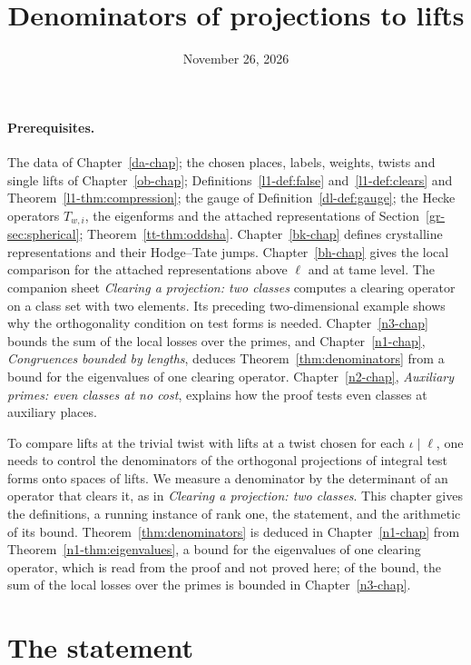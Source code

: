 \documentclass[reqno]{amsart}
\title{Denominators of projections to lifts}
\author{}
\date{November 26, 2026}
\newcounter{chap}
\theoremstyle{definition}
\theoremstyle{plain}
\begin{document}
\maketitle
{}\label{chap}

\paragraph{Prerequisites.}
The data of Chapter~\ref{da-chap}; the chosen places, labels, weights, twists and single lifts of Chapter~\ref{ob-chap}; Definitions~\ref{l1-def:false} and~\ref{l1-def:clears} and Theorem~\ref{l1-thm:compression}; the gauge of Definition~\ref{dl-def:gauge}; the Hecke operators \(T_{w,i}\), the eigenforms and the attached representations of Section~\ref{gr-sec:spherical}; Theorem~\ref{tt-thm:oddsha}.  Chapter~\ref{bk-chap} defines crystalline representations and their Hodge--Tate jumps.  Chapter~\ref{bh-chap} gives the local comparison for the attached representations above \(\ell\) and at tame level.  The companion sheet \emph{Clearing a projection: two classes} computes a clearing operator on a class set with two elements.  Its preceding two-dimensional example shows why the orthogonality condition on test forms is needed.  Chapter~\ref{n3-chap} bounds the sum of the local losses over the primes, and Chapter~\ref{n1-chap}, \emph{Congruences bounded by lengths}, deduces Theorem~\ref{thm:denominators} from a bound for the eigenvalues of one clearing operator.  Chapter~\ref{n2-chap}, \emph{Auxiliary primes: even classes at no cost}, explains how the proof tests even classes at auxiliary places.

To compare lifts at the trivial twist with lifts at a twist chosen for each \(\iota \mid \ell\), one needs to control the denominators of the orthogonal projections of integral test forms onto spaces of lifts.  We measure a denominator by the determinant of an operator that clears it, as in \emph{Clearing a projection: two classes}.  This chapter gives the definitions, a running instance of rank one, the statement, and the arithmetic of its bound.  Theorem~\ref{thm:denominators} is deduced in Chapter~\ref{n1-chap} from Theorem~\ref{n1-thm:eigenvalues}, a bound for the eigenvalues of one clearing operator, which is read from the proof \cite{GL} and not proved here; of the bound, the sum of the local losses over the primes is bounded in Chapter~\ref{n3-chap}.

\section{The statement}\label{sec:statement}
\end{document}

